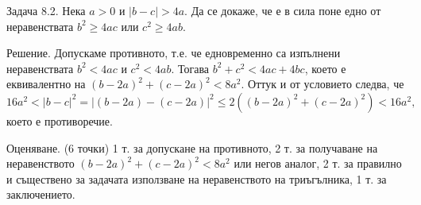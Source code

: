 
Задача 8.2. Нека $a>0$ и $|b-c|>4a$. Да се докаже, че е в сила поне едно от неравенствата $b^2 \ge 4ac$ или $c^2 \ge 4ab$.

Решение. Допускаме противното, т.е. че едновременно са изпълнени неравенствата $b^{2}<4ac$ и $c^{2}<4ab$. Тогава $b^{2}+c^{2}<4ac+4bc$, което е еквивалентно на $(b-2a)^{2}+(c-2a)^{2}<8a^{2}$. Оттук и от условието следва, че
$$
16a^{2}<|b-c|^{2}=|(b-2a)-(c-2a)|^{2}\leq 2\left((b-2a)^{2}+(c-2a)^{2}\right)<16a^{2},
$$
което е противоречие.

Оценяване. (6 точки) 1 т. за допускане на противното, 2 т. за получаване на неравенството $(b-2a)^{2}+(c-2a)^{2}<8a^{2}$ или негов аналог, 2 т. за правилно и съществено за задачата използване на неравенството на триъгълника, 1 т. за заключението.
